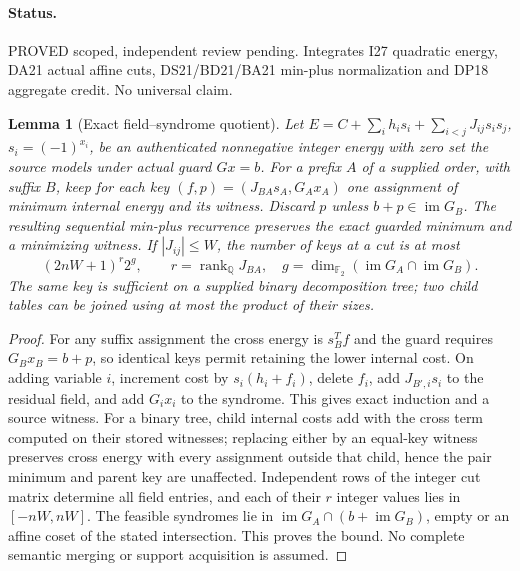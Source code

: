 \documentclass[11pt]{article}
\newtheorem{lemma}[theorem]{Lemma}
\begin{document}
\paragraph{Status.} PROVED scoped, independent review pending. Integrates I27 quadratic energy, DA21 actual affine cuts, DS21/BD21/BA21 min-plus normalization and DP18 aggregate credit. No universal claim.
\begin{lemma}[Exact field--syndrome quotient]\label{lem:dp22-field}
Let $E=C+\sum_i h_i s_i+\sum_{i<j}J_{ij}s_i s_j$, $s_i=(-1)^{x_i}$, be an authenticated nonnegative integer energy with zero set the source models under actual guard $Gx=b$. For a prefix $A$ of a supplied order, with suffix $B$, keep for each key $(f,p)=(J_{BA}s_A,G_Ax_A)$ one assignment of minimum internal energy and its witness. Discard $p$ unless $b+p\in\operatorname{im}G_B$. The resulting sequential min-plus recurrence preserves the exact guarded minimum and a minimizing witness. If $|J_{ij}|\le W$, the number of keys at a cut is at most
\[
(2nW+1)^{r}2^{g},\qquad
r=\operatorname{rank}_{\mathbb Q}J_{BA},\quad
g=\dim_{\mathbb F_2}(\operatorname{im}G_A\cap\operatorname{im}G_B).
\]
The same key is sufficient on a supplied binary decomposition tree; two child tables can be joined using at most the product of their sizes.
\end{lemma}
\begin{proof}
For any suffix assignment the cross energy is $s_B^Tf$ and the guard requires $G_Bx_B=b+p$, so identical keys permit retaining the lower internal cost. On adding variable $i$, increment cost by $s_i(h_i+f_i)$, delete $f_i$, add $J_{B',i}s_i$ to the residual field, and add $G_i x_i$ to the syndrome. This gives exact induction and a source witness. For a binary tree, child internal costs add with the cross term computed on their stored witnesses; replacing either by an equal-key witness preserves cross energy with every assignment outside that child, hence the pair minimum and parent key are unaffected. Independent rows of the integer cut matrix determine all field entries, and each of their $r$ integer values lies in $[-nW,nW]$. The feasible syndromes lie in $\operatorname{im}G_A\cap(b+\operatorname{im}G_B)$, empty or an affine coset of the stated intersection. This proves the bound. No complete semantic merging or support acquisition is assumed.
\end{proof}
\end{document}
